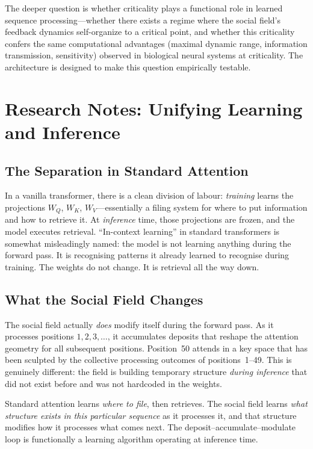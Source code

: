 \documentclass[11pt,a4paper]{article}
\begin{document}
The deeper question is whether criticality plays a functional role
in learned sequence processing---whether there exists a regime where
the social field's feedback dynamics self-organize to a critical
point, and whether this criticality confers the same computational
advantages (maximal dynamic range, information transmission,
sensitivity) observed in biological neural systems at criticality.
The architecture is designed to make this question empirically
testable.


\appendix

\section{Research Notes: Unifying Learning and Inference}
\label{app:learning-inference}

\subsection{The Separation in Standard Attention}

In a vanilla transformer, there is a clean division of labour:
\emph{training} learns the projections $W_Q$, $W_K$, $W_V$---essentially
a filing system for where to put information and how to retrieve it.  At
\emph{inference} time, those projections are frozen, and the model
executes retrieval.  ``In-context learning'' in standard transformers is
somewhat misleadingly named: the model is not learning anything during
the forward pass.  It is recognising patterns it already learned to
recognise during training.  The weights do not change.  It is retrieval
all the way down.

\subsection{What the Social Field Changes}

The social field actually \emph{does} modify itself during the forward
pass.  As it processes positions $1, 2, 3, \ldots$, it accumulates
deposits that reshape the attention geometry for all subsequent
positions.  Position~50 attends in a key space that has been sculpted by
the collective processing outcomes of positions~1--49.  This is
genuinely different: the field is building temporary structure
\emph{during inference} that did not exist before and was not hardcoded
in the weights.

Standard attention learns \emph{where to file}, then retrieves.  The
social field learns \emph{what structure exists in this particular
sequence} as it processes it, and that structure modifies how it
processes what comes next.  The deposit--accumulate--modulate loop is
functionally a learning algorithm operating at inference time.
\end{document}
